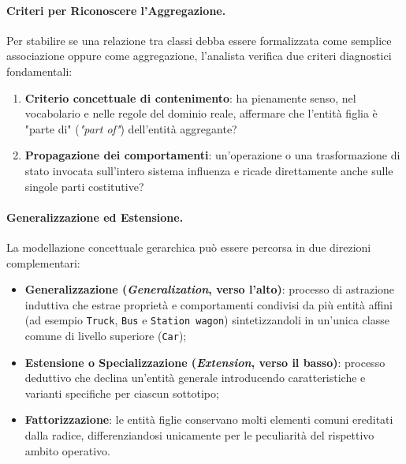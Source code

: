 \documentclass[12pt]{extarticle}
\begin{document}
\paragraph{Criteri per Riconoscere l'Aggregazione.}
Per stabilire se una relazione tra classi debba essere formalizzata come semplice associazione oppure come aggregazione, l'analista verifica due criteri diagnostici fondamentali:
\begin{enumerate}
    \item \textbf{Criterio concettuale di contenimento}: ha pienamente senso, nel vocabolario e nelle regole del dominio reale, affermare che l'entità figlia è "parte di" (\textit{"part of"}) dell'entità aggregante?
    \item \textbf{Propagazione dei comportamenti}: un'operazione o una trasformazione di stato invocata sull'intero sistema influenza e ricade direttamente anche sulle singole parti costitutive?
\end{enumerate}

\paragraph{Generalizzazione ed Estensione.}
La modellazione concettuale gerarchica può essere percorsa in due direzioni complementari:
\begin{itemize}
    \item \textbf{Generalizzazione (\textit{Generalization}, verso l'alto)}: processo di astrazione induttiva che estrae proprietà e comportamenti condivisi da più entità affini (ad esempio \texttt{Truck}, \texttt{Bus} e \texttt{Station wagon}) sintetizzandoli in un'unica classe comune di livello superiore (\texttt{Car});
    \item \textbf{Estensione o Specializzazione (\textit{Extension}, verso il basso)}: processo deduttivo che declina un'entità generale introducendo caratteristiche e varianti specifiche per ciascun sottotipo;
    \item \textbf{Fattorizzazione}: le entità figlie conservano molti elementi comuni ereditati dalla radice, differenziandosi unicamente per le peculiarità del rispettivo ambito operativo.
\end{itemize}
\end{document}
